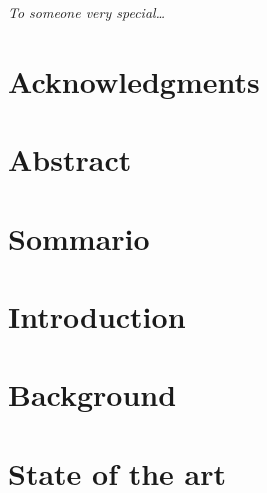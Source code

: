 \documentclass[11pt,english,openright]{book}
\begin{document}
\pagestyle{empty}



\frontmatter

\cleardoublepage{}

\begin{flushright}
\emph{To someone very special\ldots{}}\cleardoublepage{}
\par\end{flushright}

\chapter*{Acknowledgments}

\thispagestyle{empty}\cleardoublepage{}

\chapter*{Abstract}

\thispagestyle{empty}\cleardoublepage{}

\chapter*{Sommario}

\thispagestyle{empty}\cleardoublepage{}\pagestyle{fancy}\tableofcontents{}\listoffigures
\listoftables
{}
\cleardoublepage{}\mainmatter
\renewcommand{\sectionmark}[1]{\markright{\thesection.\ #1}}
\renewcommand{\chaptermark}[1]{\markboth{\thechapter.\ #1}{}}

\chapter*{Introduction\label{chap:introduction}}


\chapter{Background\label{chap:first-chapter}}



\chapter{State of the art\label{chap:second-chapter}}
\end{document}

